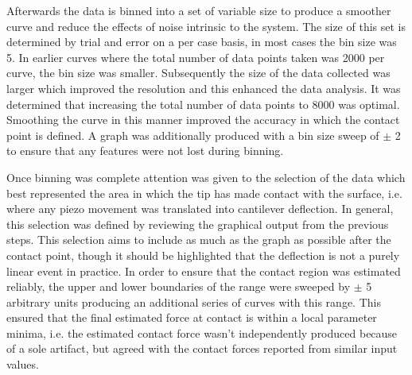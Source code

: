 Afterwards the data is binned into a set of variable size to produce a smoother curve and reduce the effects of noise intrinsic to the system. The size of this set is determined by trial and error on a per case basis, in most cases the bin size was 5. In earlier curves where the total number of data points taken was 2000 per curve, the bin size was smaller. Subsequently the size of the data collected was larger which improved the resolution and this enhanced the data analysis. It was determined that increasing the total number of data points to 8000 was optimal. Smoothing the curve in this manner improved the accuracy in which the contact point is defined. A graph was additionally produced with a bin size sweep of $\pm$ 2 to ensure that any features were not lost during binning.


Once binning was complete attention was given to the selection of the data which best represented the area in which the tip has made contact with the surface, i.e. where any piezo movement was translated into cantilever deflection. In general, this selection was defined by reviewing the graphical output from the previous steps. This selection aims to include as much as the graph as possible after the contact point, though it should be highlighted that the deflection is not a purely linear event in practice. In order to ensure that the contact region was estimated reliably, the upper and lower boundaries of the range were sweeped by $\pm$ 5 arbitrary units producing an additional series of curves with this range. This ensured that the final estimated force at contact is within a local parameter minima, i.e. the estimated contact force wasn't independently produced because of a sole artifact, but agreed with the contact forces reported from similar input values.

